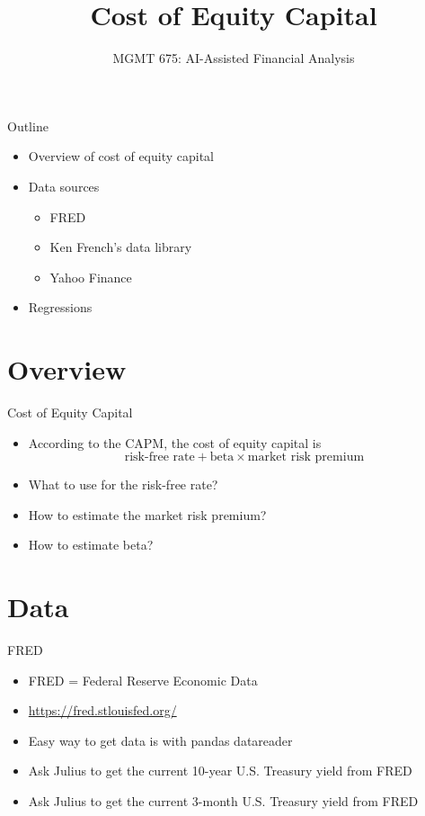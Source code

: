 \documentclass[10pt]{beamer}
\title{Cost of Equity Capital}
\subtitle{MGMT 675: AI-Assisted Financial Analysis}
\date{}
\begin{document}
\begin{frame}[plain]
\titlepage
\end{frame}

\begin{frame}{Outline}
\begin{itemize}
\item Overview of cost of equity capital
\item Data sources
  \begin{itemize}
  \item FRED
  \item Ken French's data library 
  \item Yahoo Finance
  \end{itemize}
\item Regressions
\end{itemize}
\end{frame}

\section{Overview}
\begin{frame}{Cost of Equity Capital}
\begin{itemize}
\item According to the CAPM, the cost of equity capital is
$$\text{risk-free rate} + \text{beta} \times \text{market risk premium}$$
\item What to use for the risk-free rate?
\item How to estimate the market risk premium?
\item How to estimate beta?
\end{itemize}
\end{frame}

\section{Data}
\begin{frame}{FRED}
\begin{itemize}
\item FRED = Federal Reserve Economic Data
\item \href{https://fred.stlouisfed.org/}{https://fred.stlouisfed.org/}
\item Easy way to get data is with pandas datareader
\item Ask Julius to get the current 10-year U.S. Treasury yield from FRED
\item Ask Julius to get the current 3-month U.S. Treasury yield from FRED
\end{itemize}
\end{frame}
\end{document}
